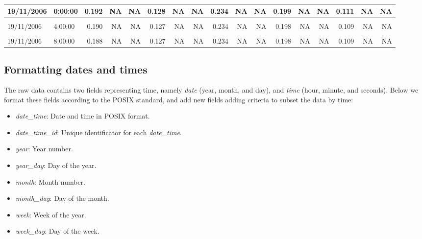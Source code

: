 \documentclass[]{article}
\providecommand{\tightlist}{%
  \setlength{\itemsep}{0pt}\setlength{\parskip}{0pt}}
\begin{document}
\begin{table}[H]
{\begin{tabular}[t]{l|l|r|r|r|r|r|r|r|r|r|r|r|r|r|r|r}
\hline
19/11/2006 & 0:00:00 & 0.192 & NA & NA & 0.128 & NA & NA & 0.234 & NA & NA & 0.199 & NA & NA & 0.111 & NA & NA\\
\hline
\cellcolor{gray!6}{19/11/2006} & \cellcolor{gray!6}{2:00:00} & \cellcolor{gray!6}{0.191} & \cellcolor{gray!6}{NA} & \cellcolor{gray!6}{NA} & \cellcolor{gray!6}{0.128} & \cellcolor{gray!6}{NA} & \cellcolor{gray!6}{NA} & \cellcolor{gray!6}{0.234} & \cellcolor{gray!6}{NA} & \cellcolor{gray!6}{NA} & \cellcolor{gray!6}{0.198} & \cellcolor{gray!6}{NA} & \cellcolor{gray!6}{NA} & \cellcolor{gray!6}{0.110} & \cellcolor{gray!6}{NA} & \cellcolor{gray!6}{NA}\\
\hline
19/11/2006 & 4:00:00 & 0.190 & NA & NA & 0.127 & NA & NA & 0.234 & NA & NA & 0.198 & NA & NA & 0.109 & NA & NA\\
\hline
\cellcolor{gray!6}{19/11/2006} & \cellcolor{gray!6}{6:00:00} & \cellcolor{gray!6}{0.189} & \cellcolor{gray!6}{NA} & \cellcolor{gray!6}{NA} & \cellcolor{gray!6}{0.127} & \cellcolor{gray!6}{NA} & \cellcolor{gray!6}{NA} & \cellcolor{gray!6}{0.234} & \cellcolor{gray!6}{NA} & \cellcolor{gray!6}{NA} & \cellcolor{gray!6}{0.198} & \cellcolor{gray!6}{NA} & \cellcolor{gray!6}{NA} & \cellcolor{gray!6}{0.109} & \cellcolor{gray!6}{NA} & \cellcolor{gray!6}{NA}\\
\hline
19/11/2006 & 8:00:00 & 0.188 & NA & NA & 0.127 & NA & NA & 0.234 & NA & NA & 0.198 & NA & NA & 0.109 & NA & NA\\
\hline
\end{tabular}}
\end{table}

\hypertarget{formatting-dates-and-times}{%
\subsection{Formatting dates and
times}\label{formatting-dates-and-times}}

The raw data contains two fields representing time, namely \emph{date}
(year, month, and day), and \emph{time} (hour, minute, and seconds).
Below we format these fields according to the POSIX standard, and add
new fields adding criteria to subset the data by time:

\begin{itemize}
\tightlist
\item
  \emph{date\_time}: Date and time in POSIX format.
\item
  \emph{date\_time\_id}: Unique identificator for each
  \emph{date\_time}.
\item
  \emph{year}: Year number.
\item
  \emph{year\_day}: Day of the year.
\item
  \emph{month}: Month number.
\item
  \emph{month\_day}: Day of the month.
\item
  \emph{week}: Week of the year.
\item
  \emph{week\_day}: Day of the week.
\end{itemize}
\end{document}
